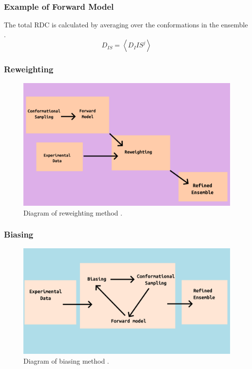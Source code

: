 \documentclass{beamer}
\begin{document}
\begin{frame}
\frametitle{Example of Forward Model}
    The total RDC is calculated by averaging over the conformations in the ensemble \cite{ozenneFlexiblemeccanoToolGeneration2012}.
    \begin{equation}
        D_{IS} = \left \langle D_I{IS}^j \right \rangle
    \end{equation}
\end{frame}

\begin{frame}
\frametitle{Reweighting}
\begin{figure}
    \centering
    \includegraphics[scale=0.4]{reweighting.png}
    \caption{Diagram of reweighting method \cite{thomasenConformationalEnsemblesIntrinsically2022}. }
    \label{fig:reweighting}
\end{figure}
\end{frame}

\begin{frame}
\frametitle{Biasing}
\begin{figure}
    \centering
    \includegraphics[scale=0.35]{biasing.png}
    \caption{Diagram of biasing method \cite{thomasenConformationalEnsemblesIntrinsically2022}. }
    \label{fig:biasing}
\end{figure}
\end{frame}
\end{document}
